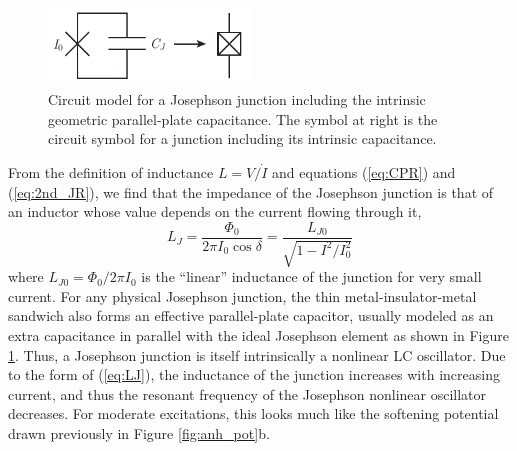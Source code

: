 \begin{figure}
\begin{center}
	\includegraphics[width = 2.11in]{scqb_chapter/JJ_schem}
\end{center}
\caption[Josephson junction circuit schematic]{Circuit model for a Josephson junction including the intrinsic geometric parallel-plate capacitance.  The symbol at right is the circuit symbol for a junction including its intrinsic capacitance.}
\label{fig:JJ_schem}
\end{figure}

From the definition of inductance $L = V/\dot{I}$ and equations (\ref{eq:CPR}) and (\ref{eq:2nd_JR}), we find that the impedance of the Josephson junction is that of an inductor whose value depends on the current flowing through it,
 \begin{equation}
L_J = \frac{\Phi_0}{2 \pi I_0 \cos{\delta}} = \frac{L_{J0}}{\sqrt{1 - I^2/I_0^2}}
\label{eq:LJ}
\end{equation}
where $L_{J0} = \Phi_0/2\pi I_0$ is the ``linear'' inductance of the junction for very small current.  For any physical Josephson junction, the thin metal-insulator-metal sandwich also forms an effective parallel-plate capacitor, usually modeled as an extra capacitance in parallel with the ideal Josephson element as shown in Figure \ref{fig:JJ_schem}.  Thus, a Josephson junction is itself intrinsically a nonlinear LC oscillator.  Due to the form of (\ref{eq:LJ}), the inductance of the junction increases with increasing current, and thus the resonant frequency of the Josephson nonlinear oscillator decreases.  For moderate excitations, this looks much like the softening potential drawn previously in Figure \ref{fig:anh_pot}b.

